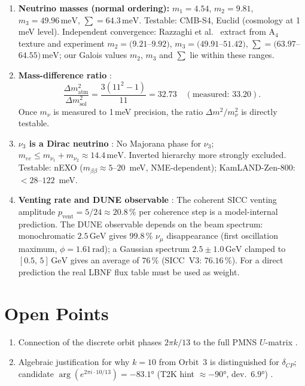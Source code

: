 \begin{enumerate}
\item \textbf{Neutrino masses (normal ordering):}
  $m_1=4.54$, $m_2=9.81$, $m_3=49.96\,\text{meV}$,
  $\sum=64.3\,\text{meV}$.
  Testable: CMB-S4, Euclid (cosmology at 1\,meV level).
  Independent convergence: Razzaghi et al.\ \cite{Razzaghi2022}
  extract from A$_4$ texture and experiment
  $m_2=(9.21$--$9.92)$, $m_3=(49.91$--$51.42)$,
  $\sum=(63.97$--$64.55)\,\text{meV}$; our Galois values
  $m_2$, $m_3$ and $\sum$ lie within these ranges.

\item \textbf{Mass-difference ratio} \KM:
  \[\frac{\Delta m^2_\text{atm}}{\Delta m^2_\text{sol}}
  =\frac{3(11^2-1)}{11}=32.73\quad(\text{measured: }33.20).\]
  Once $m_\nu$ is measured to 1\,meV precision, the ratio
  $\Delta m^2/m_\nu^2$ is directly testable.

\item \textbf{$\nu_3$ is a Dirac neutrino} \BM:
  No Majorana phase for $\nu_3$; $m_{ee}\leq m_{\nu_1}+m_{\nu_2}\approx14.4\,\text{meV}$.
  Inverted hierarchy more strongly excluded.
  Testable: nEXO ($m_{\beta\beta}\approx5$--$20$~meV, NME-dependent); KamLAND-Zen-800: $<28$--$122$~meV.

\item \textbf{Venting rate and DUNE observable} \KM:
  The coherent SICC venting amplitude
  $p_\text{vent}=5/24\approx20.8\,\%$ per coherence step is a
  model-internal prediction. The DUNE observable depends on the
  beam spectrum: monochromatic $2.5\,\text{GeV}$ gives $99.8\,\%$
  $\nu_\mu$ disappearance (first oscillation maximum,
  $\phi=1.61\,\text{rad}$); a Gaussian spectrum
  $2.5\pm1.0\,\text{GeV}$ clamped to $[0.5,\,5]\,\text{GeV}$
  gives an average of $76\,\%$ (SICC~V3: $76.16\,\%$). For a direct
  prediction the real LBNF flux table must be used as weight.
\end{enumerate}

\section{Open Points}

\begin{enumerate}
\item Connection of the discrete orbit phases $2\pi k/13$ to the
  full PMNS $U$-matrix \SM.
\item Algebraic justification for why $k=10$ from Orbit~3 is
  distinguished for $\delta_{CP}$; candidate
  $\arg(e^{2\pi i\cdot10/13})=-83{.}1°$
  (T2K hint $\approx-90°$, dev.\ $6{.}9°$) \SM.
\end{enumerate}


